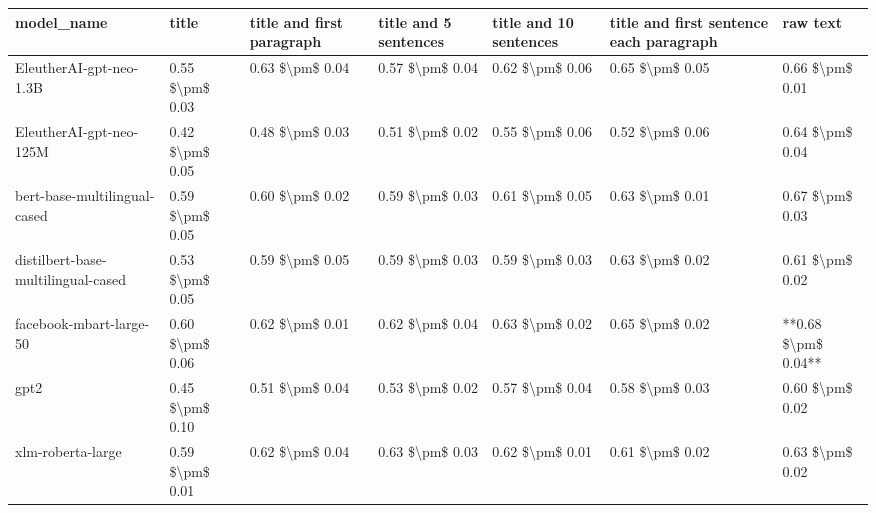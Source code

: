 \begin{tabular}{lllllll}
\toprule
                        model\_name &           title & title and first paragraph & title and 5 sentences & title and 10 sentences & title and first sentence each paragraph &            raw text \\
\midrule
           EleutherAI-gpt-neo-1.3B & 0.55 \$\textbackslash pm\$ 0.03 &           0.63 \$\textbackslash pm\$ 0.04 &       0.57 \$\textbackslash pm\$ 0.04 &        0.62 \$\textbackslash pm\$ 0.06 &                         0.65 \$\textbackslash pm\$ 0.05 &     0.66 \$\textbackslash pm\$ 0.01 \\
           EleutherAI-gpt-neo-125M & 0.42 \$\textbackslash pm\$ 0.05 &           0.48 \$\textbackslash pm\$ 0.03 &       0.51 \$\textbackslash pm\$ 0.02 &        0.55 \$\textbackslash pm\$ 0.06 &                         0.52 \$\textbackslash pm\$ 0.06 &     0.64 \$\textbackslash pm\$ 0.04 \\
      bert-base-multilingual-cased & 0.59 \$\textbackslash pm\$ 0.05 &           0.60 \$\textbackslash pm\$ 0.02 &       0.59 \$\textbackslash pm\$ 0.03 &        0.61 \$\textbackslash pm\$ 0.05 &                         0.63 \$\textbackslash pm\$ 0.01 &     0.67 \$\textbackslash pm\$ 0.03 \\
distilbert-base-multilingual-cased & 0.53 \$\textbackslash pm\$ 0.05 &           0.59 \$\textbackslash pm\$ 0.05 &       0.59 \$\textbackslash pm\$ 0.03 &        0.59 \$\textbackslash pm\$ 0.03 &                         0.63 \$\textbackslash pm\$ 0.02 &     0.61 \$\textbackslash pm\$ 0.02 \\
           facebook-mbart-large-50 & 0.60 \$\textbackslash pm\$ 0.06 &           0.62 \$\textbackslash pm\$ 0.01 &       0.62 \$\textbackslash pm\$ 0.04 &        0.63 \$\textbackslash pm\$ 0.02 &                         0.65 \$\textbackslash pm\$ 0.02 & **0.68 \$\textbackslash pm\$ 0.04** \\
                              gpt2 & 0.45 \$\textbackslash pm\$ 0.10 &           0.51 \$\textbackslash pm\$ 0.04 &       0.53 \$\textbackslash pm\$ 0.02 &        0.57 \$\textbackslash pm\$ 0.04 &                         0.58 \$\textbackslash pm\$ 0.03 &     0.60 \$\textbackslash pm\$ 0.02 \\
                 xlm-roberta-large & 0.59 \$\textbackslash pm\$ 0.01 &           0.62 \$\textbackslash pm\$ 0.04 &       0.63 \$\textbackslash pm\$ 0.03 &        0.62 \$\textbackslash pm\$ 0.01 &                         0.61 \$\textbackslash pm\$ 0.02 &     0.63 \$\textbackslash pm\$ 0.02 \\
\bottomrule
\end{tabular}
